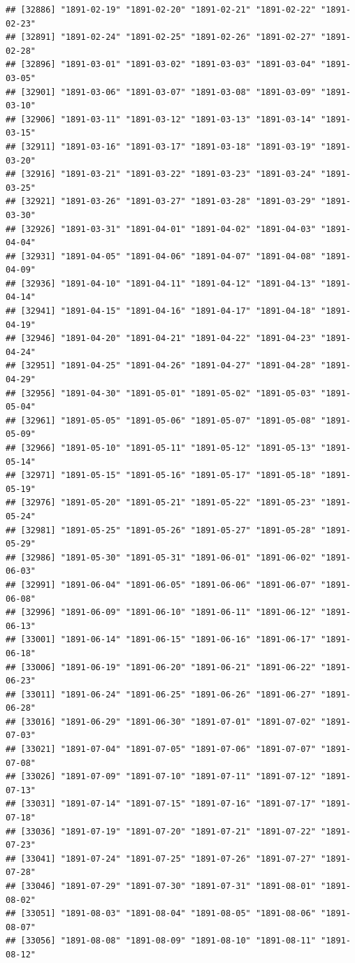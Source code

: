 \documentclass{article}\usepackage[]{graphicx}\usepackage[]{color}
\makeatletter
\newenvironment{kframe}{%
 \def\at@end@of@kframe{}%
 \ifinner\ifhmode%
  \def\at@end@of@kframe{\end{minipage}}%
  \begin{minipage}{\columnwidth}%
 \fi\fi%
 \def\FrameCommand##1{\hskip\@totalleftmargin \hskip-\fboxsep
 \colorbox{shadecolor}{##1}\hskip-\fboxsep
     \hskip-\linewidth \hskip-\@totalleftmargin \hskip\columnwidth}%
 \MakeFramed {\advance\hsize-\width
   \@totalleftmargin\z@ \linewidth\hsize
   \@setminipage}}%
 {\par\unskip\endMakeFramed%
 \at@end@of@kframe}
\newenvironment{knitrout}{}{} %
\makeatother
\begin{document}
\begin{description}
\begin{knitrout}
\begin{kframe}
\begin{verbatim}
## [32886] "1891-02-19" "1891-02-20" "1891-02-21" "1891-02-22" "1891-02-23"
## [32891] "1891-02-24" "1891-02-25" "1891-02-26" "1891-02-27" "1891-02-28"
## [32896] "1891-03-01" "1891-03-02" "1891-03-03" "1891-03-04" "1891-03-05"
## [32901] "1891-03-06" "1891-03-07" "1891-03-08" "1891-03-09" "1891-03-10"
## [32906] "1891-03-11" "1891-03-12" "1891-03-13" "1891-03-14" "1891-03-15"
## [32911] "1891-03-16" "1891-03-17" "1891-03-18" "1891-03-19" "1891-03-20"
## [32916] "1891-03-21" "1891-03-22" "1891-03-23" "1891-03-24" "1891-03-25"
## [32921] "1891-03-26" "1891-03-27" "1891-03-28" "1891-03-29" "1891-03-30"
## [32926] "1891-03-31" "1891-04-01" "1891-04-02" "1891-04-03" "1891-04-04"
## [32931] "1891-04-05" "1891-04-06" "1891-04-07" "1891-04-08" "1891-04-09"
## [32936] "1891-04-10" "1891-04-11" "1891-04-12" "1891-04-13" "1891-04-14"
## [32941] "1891-04-15" "1891-04-16" "1891-04-17" "1891-04-18" "1891-04-19"
## [32946] "1891-04-20" "1891-04-21" "1891-04-22" "1891-04-23" "1891-04-24"
## [32951] "1891-04-25" "1891-04-26" "1891-04-27" "1891-04-28" "1891-04-29"
## [32956] "1891-04-30" "1891-05-01" "1891-05-02" "1891-05-03" "1891-05-04"
## [32961] "1891-05-05" "1891-05-06" "1891-05-07" "1891-05-08" "1891-05-09"
## [32966] "1891-05-10" "1891-05-11" "1891-05-12" "1891-05-13" "1891-05-14"
## [32971] "1891-05-15" "1891-05-16" "1891-05-17" "1891-05-18" "1891-05-19"
## [32976] "1891-05-20" "1891-05-21" "1891-05-22" "1891-05-23" "1891-05-24"
## [32981] "1891-05-25" "1891-05-26" "1891-05-27" "1891-05-28" "1891-05-29"
## [32986] "1891-05-30" "1891-05-31" "1891-06-01" "1891-06-02" "1891-06-03"
## [32991] "1891-06-04" "1891-06-05" "1891-06-06" "1891-06-07" "1891-06-08"
## [32996] "1891-06-09" "1891-06-10" "1891-06-11" "1891-06-12" "1891-06-13"
## [33001] "1891-06-14" "1891-06-15" "1891-06-16" "1891-06-17" "1891-06-18"
## [33006] "1891-06-19" "1891-06-20" "1891-06-21" "1891-06-22" "1891-06-23"
## [33011] "1891-06-24" "1891-06-25" "1891-06-26" "1891-06-27" "1891-06-28"
## [33016] "1891-06-29" "1891-06-30" "1891-07-01" "1891-07-02" "1891-07-03"
## [33021] "1891-07-04" "1891-07-05" "1891-07-06" "1891-07-07" "1891-07-08"
## [33026] "1891-07-09" "1891-07-10" "1891-07-11" "1891-07-12" "1891-07-13"
## [33031] "1891-07-14" "1891-07-15" "1891-07-16" "1891-07-17" "1891-07-18"
## [33036] "1891-07-19" "1891-07-20" "1891-07-21" "1891-07-22" "1891-07-23"
## [33041] "1891-07-24" "1891-07-25" "1891-07-26" "1891-07-27" "1891-07-28"
## [33046] "1891-07-29" "1891-07-30" "1891-07-31" "1891-08-01" "1891-08-02"
## [33051] "1891-08-03" "1891-08-04" "1891-08-05" "1891-08-06" "1891-08-07"
## [33056] "1891-08-08" "1891-08-09" "1891-08-10" "1891-08-11" "1891-08-12"

\end{verbatim}
\end{kframe}
\end{knitrout}
\end{description}
\end{document}
